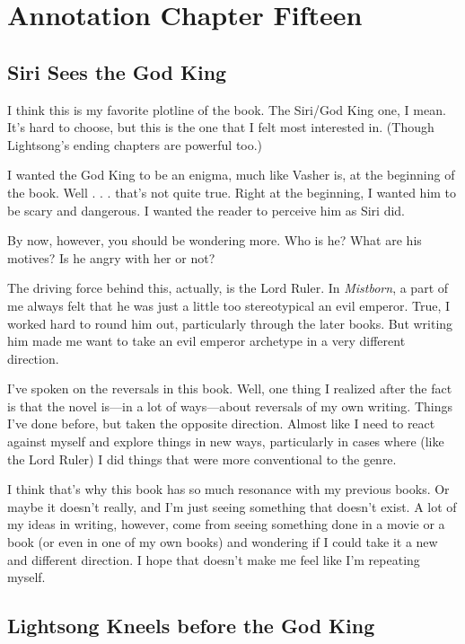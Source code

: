 \section{Annotation Chapter Fifteen}

\subsection*{Siri Sees the God King}

I think this is my favorite plotline of the book. The Siri/God King one, I mean. It’s hard to choose, but this is the one that I felt most interested in. (Though Lightsong’s ending chapters are powerful too.)

I wanted the God King to be an enigma, much like Vasher is, at the beginning of the book. Well . . . that’s not quite true. Right at the beginning, I wanted him to be scary and dangerous. I wanted the reader to perceive him as Siri did.

By now, however, you should be wondering more. Who is he? What are his motives? Is he angry with her or not?

The driving force behind this, actually, is the Lord Ruler. In \textit{Mistborn}, a part of me always felt that he was just a little too stereotypical an evil emperor. True, I worked hard to round him out, particularly through the later books. But writing him made me want to take an evil emperor archetype in a very different direction.

I’ve spoken on the reversals in this book. Well, one thing I realized after the fact is that the novel is—in a lot of ways—about reversals of my own writing. Things I’ve done before, but taken the opposite direction. Almost like I need to react against myself and explore things in new ways, particularly in cases where (like the Lord Ruler) I did things that were more conventional to the genre.

I think that’s why this book has so much resonance with my previous books. Or maybe it doesn’t really, and I’m just seeing something that doesn’t exist. A lot of my ideas in writing, however, come from seeing something done in a movie or a book (or even in one of my own books) and wondering if I could take it a new and different direction. I hope that doesn’t make me feel like I’m repeating myself.

\subsection*{Lightsong Kneels before the God King}

